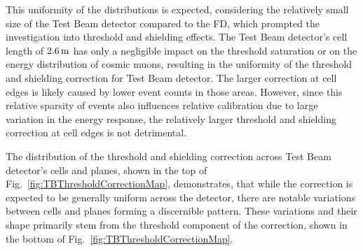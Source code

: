 This uniformity of the distributions is expected, considering the relatively small size of the Test Beam detector compared to the \gls{FD}, which prompted the investigation into threshold and shielding effects. The Test Beam detector's cell length of $\unit[2.6]{m}$ has only a negligible impact on the threshold saturation or on the energy distribution of cosmic muons, resulting in  the uniformity of the threshold and shielding correction for Test Beam detector. The larger correction at cell edges is likely caused by lower event counts in those areas. However, since this relative sparsity of events also influences relative calibration due to large variation in the energy response, the relatively larger threshold and shielding correction at cell edges is not detrimental.

The distribution of the threshold and shielding correction across Test Beam detector's cells and planes, shown in the top of Fig.~\ref{fig:TBThresholdCorrectionMap}, demonstrates, that while the correction is expected to be generally uniform across the detector, there are notable variations between cells and planes forming a discernible pattern. These variations and their shape primarily stem from the threshold component of the correction, shown in the bottom of Fig.~\ref{fig:TBThresholdCorrectionMap}.

